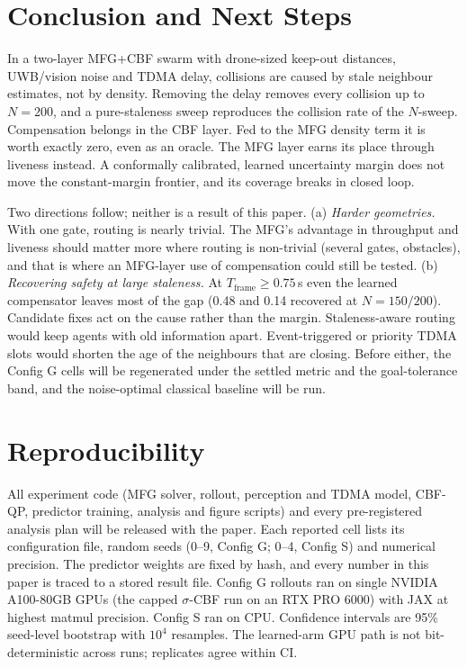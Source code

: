 \documentclass{article}
\newcommand{\Tf}{T_{\mathrm{frame}}}
\begin{document}
\section{Conclusion and Next Steps}
In a two-layer MFG+CBF swarm with drone-sized keep-out distances, UWB/vision noise and TDMA delay,
collisions are caused by stale neighbour estimates, not by density. Removing the delay removes
every collision up to $N=200$, and a pure-staleness sweep reproduces the collision rate of the
$N$-sweep. Compensation belongs in the CBF layer. Fed to the MFG density term it is worth exactly
zero, even as an oracle. The MFG layer earns its place through liveness instead. A conformally
calibrated, learned uncertainty margin does not move the constant-margin frontier, and its
coverage breaks in closed loop.

Two directions follow; neither is a result of this paper.
(a) \emph{Harder geometries.} With one gate, routing is nearly trivial. The MFG's advantage in
throughput and liveness should matter more where routing is non-trivial (several gates,
obstacles), and that is where an MFG-layer use of compensation could still be tested.
(b) \emph{Recovering safety at large staleness.} At $\Tf \ge 0.75$\,s even the learned
compensator leaves most of the gap (0.48 and 0.14 recovered at $N=150/200$). Candidate fixes act on
the cause rather than the margin. Staleness-aware routing would keep agents with old information
apart. Event-triggered or priority TDMA slots would shorten the age of the neighbours that are
closing.
Before either, the Config G cells will be regenerated under the settled metric and the goal-tolerance
band, and the noise-optimal classical baseline will be run.

\section*{Reproducibility}
All experiment code (MFG solver, rollout, perception and TDMA model, CBF-QP, predictor training,
analysis and figure scripts) and every pre-registered analysis plan will be released with the paper.
Each reported cell lists its configuration file, random seeds (0--9, Config G; 0--4, Config S) and
numerical precision. The predictor weights are fixed by hash, and every number in this paper is traced
to a stored result file. Config G rollouts ran on single NVIDIA A100-80GB GPUs (the capped
$\sigma$-CBF run on an RTX PRO 6000) with JAX at highest matmul precision. Config S ran on CPU.
Confidence intervals are 95\% seed-level bootstrap with $10^4$ resamples. The learned-arm GPU path is
not bit-deterministic across runs; replicates agree within CI.
\end{document}
